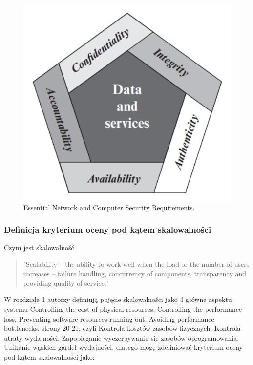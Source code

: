 \documentclass[runningheads,12pt]{llncs}
\begin{document}
\begin{figure}
    \includegraphics[width=\linewidth]{images/image-security.png}
    \caption{Essential Network and Computer Security Requirements.} \label{fig1}
\end{figure}

\subsubsection{Definicja kryterium oceny pod kątem skalowalności}

Czym jest skalowalność 

\begin{quote}
    "Scalability – the ability to work well when the load or the number of users increases – failure handling, concurrency of components, transparency and providing quality of service." ~\cite[p. 21]{coulouris2011distributed}
\end{quote}

W rozdziale 1 autorzy definiują pojęcie skalowalności jako 4 główne aspektu systemu Controlling the cost of physical resources, Controlling the performance loss, Preventing software resources running out, Avoiding performance bottlenecks, strony 20-21, czyli Kontrola kosztów zasobów fizycznych, Kontrola utraty wydajności, Zapobieganie wyczerpywaniu się zasobów oprogramowania, Unikanie wąskich gardeł wydajności, dlatego mogę zdefiniować kryterium oceny pod kątem skalowalności jako:
\end{document}
